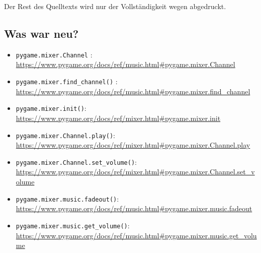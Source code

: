 Der Rest des Quelltexts wird nur der Vollständigkeit wegen abgedruckt.



\subsection*{Was war neu?}
\begin{itemize}
	\item\texttt{pygame.mixer.Channel} :
\\ \url{https://www.pygame.org/docs/ref/music.html#pygame.mixer.Channel}

	\item\texttt{pygame.mixer.find\_channel()} :
\\ \url{https://www.pygame.org/docs/ref/music.html#pygame.mixer.find_channel}

	\item \texttt{pygame.mixer.init()}:
\\ \url{https://www.pygame.org/docs/ref/mixer.html#pygame.mixer.init}

	\item \texttt{pygame.mixer.Channel.play()}:
\\ \url{https://www.pygame.org/docs/ref/mixer.html#pygame.mixer.Channel.play}

	\item \texttt{pygame.mixer.Channel.set\_volume()}:
\\ \url{https://www.pygame.org/docs/ref/mixer.html#pygame.mixer.Channel.set_volume}

	\item\texttt{pygame.mixer.music.fadeout()}:
\\ \url{https://www.pygame.org/docs/ref/music.html#pygame.mixer.music.fadeout}

	\item \texttt{pygame.mixer.music.get\_volume()}:
\\ \url{https://www.pygame.org/docs/ref/music.html#pygame.mixer.music.get_volume}


\end{itemize}
